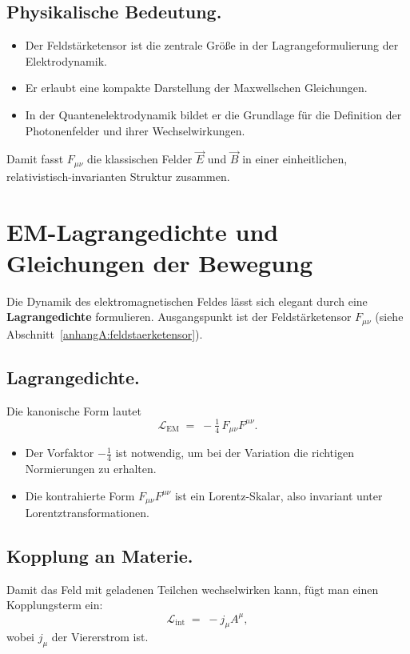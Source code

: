 \subsection*{Physikalische Bedeutung.}
\begin{itemize}
	\item Der Feldstärketensor ist die zentrale Größe in der 
	Lagrangeformulierung der Elektrodynamik.
	\item Er erlaubt eine kompakte Darstellung der Maxwellschen Gleichungen.
	\item In der Quantenelektrodynamik bildet er die Grundlage 
	für die Definition der Photonenfelder und ihrer Wechselwirkungen.
\end{itemize}

\medskip
Damit fasst \( F_{\mu\nu} \) die klassischen Felder \( \vec{E} \) und \( \vec{B} \) 
in einer einheitlichen, relativistisch-invarianten Struktur zusammen.
\section{EM-Lagrangedichte und Gleichungen der Bewegung}
\label{anhangA:lagrange_em}

Die Dynamik des elektromagnetischen Feldes lässt sich elegant 
durch eine \textbf{Lagrangedichte} formulieren. 
Ausgangspunkt ist der Feldstärketensor \( F_{\mu\nu} \) 
(siehe Abschnitt~\ref{anhangA:feldstaerketensor}).

\subsection*{Lagrangedichte.}
Die kanonische Form lautet
\[
\mathcal{L}_{\text{EM}} \;=\; -\tfrac{1}{4} \, F_{\mu\nu} F^{\mu\nu}.
\]

\begin{itemize}
	\item Der Vorfaktor \(-\tfrac{1}{4}\) ist notwendig, um bei der Variation 
	die richtigen Normierungen zu erhalten.
	\item Die kontrahierte Form \(F_{\mu\nu} F^{\mu\nu}\) 
	ist ein Lorentz-Skalar, also invariant unter Lorentztransformationen.
\end{itemize}

\subsection*{Kopplung an Materie.}
Damit das Feld mit geladenen Teilchen wechselwirken kann,
fügt man einen Kopplungsterm ein:
\[
\mathcal{L}_{\text{int}} \;=\; - j_\mu A^\mu ,
\]
wobei \( j_\mu \) der Viererstrom ist.

